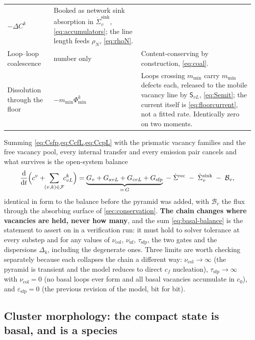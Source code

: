 \documentclass{article}
\newcommand{\spvec}[1]{\bm{\mathsf{#1}}}   %
\begin{document}
\begin{table}[htbp]
\begin{tabularx}{\textwidth}{@{}l l X@{}}
$-\Delta C^{k}$ &
Booked as network sink absorption in $\dot\Sigma^{\mathrm{sink}}_v$,
\cref{eq:accumulators}; the line length feeds $\rho_N$, \cref{eq:rhoN}. \\
Loop--loop coalescence &
number only &
Content-conserving by construction, \cref{eq:coal}. \\
Dissolution through the floor &
$-m_{\min}\Phi^{k}_{\min}$ &
Loops crossing $m_{\min}$ carry $m_{\min}$ defects each, released to the mobile
vacancy line by $\spvec S_{vL}$, \cref{eq:Semit}; the current itself is
\cref{eq:floorcurrent}, not a fitted rate. Identically zero on two moments. \\
\bottomrule
\end{tabularx}
\end{table}

Summing \cref{eq:Csfp,eq:CcfL,eq:CcpL} with the prismatic vacancy families and
the free vacancy pool, every internal transfer and every emission pair cancels
and what survives is the open-system balance
\begin{equation}
  \frac{\mathrm d}{\mathrm dt}
  \Bigl(c^v+\!\!\sum_{(v,k)\in\mathcal F}\!\!c^{k}_{vL}\Bigr)
  =\underbrace{G_v+G_{avL}+G_{cvL}+G_{\mathrm{sfp}}}_{=\,G}
  \;-\;\dot\Sigma^{\mathrm{rec}}
  \;-\;\dot\Sigma^{\mathrm{sink}}_v
  \;-\;\mathcal B_v ,
  \label{eq:basal-balance}
\end{equation}
identical in form to the balance before the pyramid was added, with $\mathcal B_v$
the flux through the absorbing surface of \cref{sec:conservation}. \textbf{The
chain changes where vacancies are held, never how many}, and the sum
\cref{eq:basal-balance} is the statement to assert on in a verification run:
it must hold to solver tolerance at every substep and for any values of
$\nu_{\mathrm{col}}$, $\nu_{\mathrm{uf}}$, $\tau_{\mathrm{sfp}}$, the two gates
and the dispersions $\Delta_k$, including the degenerate ones. Three limits are worth checking separately
because each collapses the chain a different way: $\nu_{\mathrm{col}}\to\infty$
(the pyramid is transient and the model reduces to direct $c_f$ nucleation),
$\tau_{\mathrm{sfp}}\to\infty$ with $\nu_{\mathrm{col}}=0$ (no basal loops ever
form and all basal vacancies accumulate in $c_0$), and
$\varepsilon_{\mathrm{sfp}}=0$ (the previous revision of the model, bit for bit).

\subsection{Cluster morphology: the compact state is basal, and is a species}
\label{sec:morphology}
\end{document}
